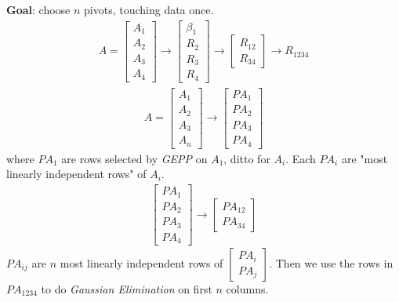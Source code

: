 \documentclass[11pt]{article}
\numberwithin{equation}{section}
\begin{document}
\textbf{Goal}: choose $n$ pivots, touching data once. \begin{align*}
    A=\left[\begin{array}{l}
        A_{1} \\
        A_{2} \\
        A_{3} \\
        A_{4}
        \end{array}\right] \rightarrow\left[\begin{array}{l}
        \beta_{1} \\
        R_{2} \\
        R_{3} \\
        R_{4}
        \end{array}\right] \rightarrow \left[\begin{array}{l}
            R_{12} \\
            R_{34}
            \end{array}\right] \rightarrow R_{1234}
\end{align*}
\begin{align*}
    A=\left[\begin{array}{l}
        A_{1} \\
        A_{2} \\
        A_{3} \\
        A_{u}
        \end{array}\right] \rightarrow\left[\begin{array}{l}
        P A_{1} \\
        P A_{2} \\
        P A_{3} \\
        P A_{4}
        \end{array}\right]
\end{align*}
where $PA_1$ are rows selected by \textit{GEPP} on $A_1$, ditto for $A_i$. Each $PA_i$ are "most linearly independent rows" of $A_i$. \begin{align*}
    \left[\begin{array}{l}
        PA_{1} \\
        PA_{2} \\
        PA_{3} \\
        PA_{4}
        \end{array}\right] \rightarrow \left[\begin{array}{l}
            PA_{12} \\
            PA_{34}
            \end{array}\right]
\end{align*}
$PA_{ij}$ are $n$ most linearly independent rows of $\left[\begin{array}{l}
    P A_{i} \\
    P A_{j}
    \end{array}\right]$. Then we use the rows in $PA_{1234}$ to do \textit{Gaussian Elimination} on first $n$ columns.
\end{document}

